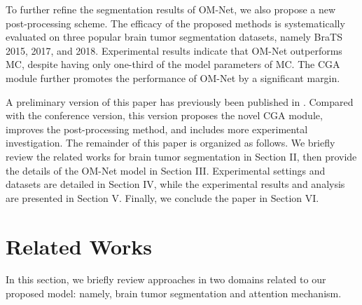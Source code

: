 \documentclass[journal,twoside]{IEEEtran}
\begin{document}
To further refine the segmentation results of OM-Net, we also propose a new post-processing scheme. The efficacy of the proposed methods is systematically evaluated on three popular brain tumor segmentation datasets, namely BraTS 2015, 2017, and 2018. Experimental results indicate that OM-Net outperforms MC, despite having only one-third of the model parameters of MC. The CGA module further promotes the performance of OM-Net by a significant margin. 




A preliminary version of this paper has previously been published in \cite{zhou2018one}. Compared with the conference version, this version  proposes the novel CGA module, improves the post-processing method, and includes more experimental investigation. The remainder of this paper is organized as follows. We briefly review the related works for brain tumor segmentation in Section II, then provide the details of the OM-Net model in Section III. Experimental settings and datasets are detailed in Section IV, while the experimental results and analysis are presented in Section V. Finally, we conclude the paper in Section VI.






\section{Related Works}
In this section, we briefly review approaches in two domains related to our proposed model: namely, brain tumor segmentation and attention mechanism.
\end{document}
